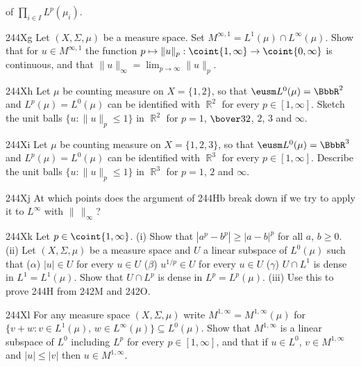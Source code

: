 {

\noindent of $\prod_{i\in I}L^p(\mu_i)$.

\spheader 244Xg Let $(X,\Sigma,\mu)$ be a measure space.   Set
$M^{\infty,1}=L^1(\mu)\cap L^{\infty}(\mu)$.   Show that for
$u\in M^{\infty,1}$ the function
$p\mapsto\|u\|_p:\coint{1,\infty}\to\coint{0,\infty}$ is continuous, and
that $\|u\|_{\infty}=\lim_{p\to\infty}\|u\|_p$.   

\spheader 244Xh Let $\mu$ be counting measure on $X=\{1,2\}$, so that
$\eusm L^0(\mu)=\BbbR^2$ and $L^p(\mu)=L^0(\mu)$ can be identified with
$\BbbR^2$ for every $p\in[1,\infty]$.   Sketch the unit balls
$\{u:\|u\|_p\le 1\}$ in $\BbbR^2$ for $p=1$, $\bover32$, $2$, $3$ and
$\infty$.

\spheader 244Xi Let $\mu$ be counting measure on $X=\{1,2,3\}$, so that
$\eusm L^0(\mu)=\BbbR^3$ and $L^p(\mu)=L^0(\mu)$ can be identified with
$\BbbR^3$ for every $p\in[1,\infty]$.   Describe the unit balls
$\{u:\|u\|_p\le 1\}$ in $\BbbR^3$ for $p=1$, $2$ and $\infty$.

\spheader 244Xj At which points does the argument of
244Hb break down if we try to apply it to $L^{\infty}$ with
$\|\,\|_{\infty}$?

\spheader 244Xk Let $p\in\coint{1,\infty}$.   (i) Show that
$|a^p-b^p|\ge|a-b|^p$ for all $a$,
$b\ge 0$.      (ii) Let $(X,\Sigma,\mu)$ be a measure space and $U$ a linear
subspace of $L^0(\mu)$ such that ($\alpha$) $|u|\in U$ for every
$u\in U$ ($\beta$) $u^{1/p}\in U$ for every $u\in U$ ($\gamma$)
$U\cap L^1$ is dense in $L^1=L^1(\mu)$.   Show that $U\cap L^p$ is dense
in $L^p=L^p(\mu)$.      (iii) Use this to prove 244H from 242M
and 242O.

\spheader 244Xl For any measure space $(X,\Sigma,\mu)$ write
$M^{1,\infty}=M^{1,\infty}(\mu)$ for $\{v+w:v\in L^1(\mu),\,w\in
L^{\infty}(\mu)\}\subseteq L^0(\mu)$.    Show that $M^{1,\infty}$ is a
linear subspace of $L^0$ including $L^p$ for every $p\in[1,\infty]$, and
that if $u\in L^0$, $v\in M^{1,\infty}$ and $|u|\le |v|$ then $u\in
M^{1,\infty}$.  

}
